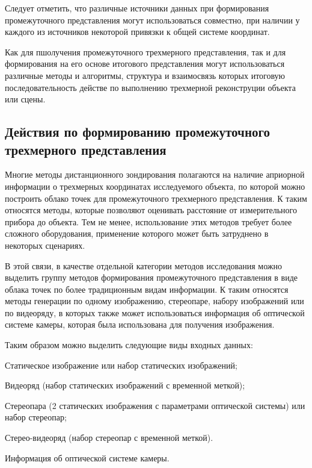 Следует отметить, что различные источники данных при формирования промежуточного представления могут использоваться совместно, при наличии у каждого из источников некоторой привязки к общей системе координат.

Как для пшолучения промежуточного трехмерного представления, так и для формирования на его основе итогового представления могут использоваться различные методы и алгоритмы, структура и взаимосвязь которых итоговую последовательность действе по выполнению трехмерной реконструции объекта или сцены.


\subsection{Действия по формированию промежуточного трехмерного представления}

Многие методы дистанционного зондирования полагаются на наличие априорной информации о трехмерных координатах исследуемого объекта, по которой можно построить облако точек для промежуточного трехмерного представления. К таким относятся методы, которые позволяют оценивать расстояние от измерительного прибора до объекта. Тем не менее, использование этих методов требует более сложного оборудования, применение которого может быть затруднено в некоторых сценариях.

В этой связи, в качестве отдельной категории методов исследования можно выделить группу методов формирования промежуточного представления в виде облака точек по более традиционным видам информации. К таким относятся методы генерации по одному изображению, стереопаре, набору изображений или по видеоряду, в которых также может использоваться информация об оптической системе камеры, которая была использована для получения изображения.

Таким образом можно выделить следующие виды входных данных:
\begin{textitemize}
    \item Статическое изображение или набор статических изображений;
    \item Видеоряд (набор статических изображений с временной меткой);
    \item Стереопара (2 статических изображения с параметрами оптической системы) или набор стереопар;
    \item Стерео-видеоряд (набор стереопар с временной меткой).
    \item Информация об оптической системе камеры.
\end{textitemize}

